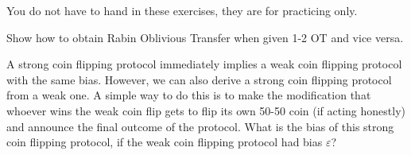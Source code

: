 \documentclass[a4paper,10pt,landscape,twocolumn]{scrartcl}
\begin{document}
\newcommand{\Hi}{\mathcal{H}}

\practiceproblems

{\sffamily\noindent
You do not have to hand in these exercises, they are for practicing only. %
}

\begin{exercise}[Rabin OT vs 1-2 OT]
Show how to obtain Rabin Oblivious Transfer when given 1-2 OT and vice versa.
\end{exercise}

\begin{exercise}
A strong coin flipping protocol immediately implies a weak coin flipping protocol with the same bias. However, we can also derive a strong coin flipping protocol from a weak one. A simple way to do this is to make the modification that whoever wins the weak coin flip gets to flip its own 50-50 coin (if acting honestly) and announce the final outcome of the protocol. What is the bias of this strong coin flipping protocol, if the weak coin flipping protocol had bias $\varepsilon$?
\end{exercise}
\end{document}
